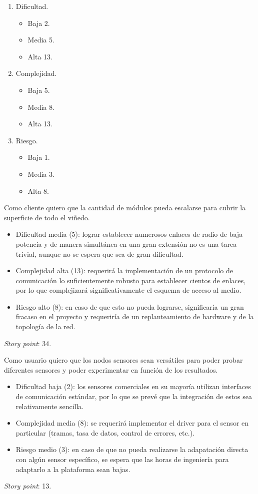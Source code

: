 \documentclass[
11pt, %
codirector, %
]{charter}
\begin{document}
\begin{enumerate}
	\item Dificultad.
	\begin{itemize}
		\item Baja 2.
		\item Media 5.
		\item Alta 13.
	\end{itemize}

\item Complejidad.
	\begin{itemize}
		\item Baja 5.
		\item Media 8.
		\item Alta 13.
	\end{itemize}

\item Riesgo.
	\begin{itemize}
		\item Baja 1.
		\item Media 3.
		\item Alta 8.
	\end{itemize}
\end{enumerate}


Como cliente quiero que la cantidad de módulos pueda escalarse para cubrir la superficie de todo el viñedo.
\begin{itemize}
\item Dificultad media (5): lograr establecer numerosos enlaces de radio de baja potencia y de manera simultánea en una gran extensión no es una tarea trivial, aunque no se espera que sea de gran dificultad. 
\item Complejidad alta (13): requerirá la implementación de un protocolo de comunicación lo suficientemente robusto para establecer cientos de enlaces, por lo que complejizará significativamente el esquema de acceso al medio.
\item Riesgo alto (8): en caso de que esto no pueda lograrse, significaría un gran fracaso en el proyecto y requeriría de un replanteamiento de hardware y de la topología de la red.
\end{itemize}
\textit{Story point}: 34.

Como usuario quiero que los nodos sensores sean versátiles para poder probar diferentes sensores y poder experimentar en función de los resultados.
\begin{itemize}
\item Dificultad baja (2): los sensores comerciales en su mayoría utilizan interfaces de comunicación estándar, por lo que se prevé que la integración de estos sea relativamente sencilla.
\item Complejidad media (8): se requerirá implementar el driver para el sensor en particular (tramas, tasa de datos, control de errores, etc.).
\item Riesgo medio (3): en caso de que no pueda realizarse la adapatación directa con algún sensor específico, se espera que las horas de ingeniería para adaptarlo a la plataforma sean bajas.
\end{itemize}
\textit{Story point}: 13.
\end{document}
